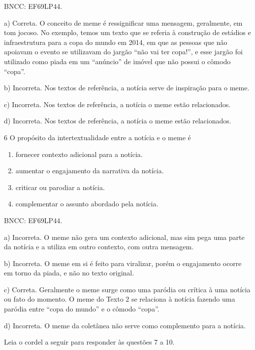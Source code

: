 {BNCC: EF69LP44.

a) Correta. O conceito de meme é ressignificar uma mensagem, geralmente,
em tom jocoso. No exemplo, temos um texto que se referia à construção de
estádios e infraestrutura para a copa do mundo em 2014, em que as
pessoas que não apoiavam o evento se utilizavam do jargão ``não vai ter
copa!'', e esse jargão foi utilizado como piada em um ``anúncio'' de
imóvel que não possui o cômodo ``copa''.

b) Incorreta. Nos textos de referência, a notícia serve de inspiração
para o meme.

c) Incorreta. Nos textos de referência, a notícia o meme estão
relacionados.

d) Incorreta. Nos textos de referência, a notícia o meme estão
relacionados.

\num{6} O propósito da intertextualidade entre a notícia e o meme é

\begin{enumerate}
\def\labelenumi{\alph{enumi})}
\item
  fornecer contexto adicional para a notícia.
\item
  aumentar o engajamento da narrativa da notícia.
\item
  criticar ou parodiar a notícia.
\item
  complementar o assunto abordado pela notícia.
\end{enumerate}

BNCC: EF69LP44.

a) Incorreta. O meme não gera um contexto adicional, mas sim pega uma
parte da notícia e a utiliza em outro contexto, com outra mensagem.

b) Incorreta. O meme em si é feito para viralizar, porém o engajamento
ocorre em torno da piada, e não no texto original.

c) Correta. Geralmente o meme surge como uma paródia ou crítica à uma
notícia ou fato do momento. O meme do Texto 2 se relaciona à notícia
fazendo uma paródia entre ``copa do mundo'' e o cômodo ``copa''.

d) Incorreta. O meme da coletânea não serve como complemento para a
notícia.

Leia o cordel a seguir para responder às questões 7 a 10.

}
